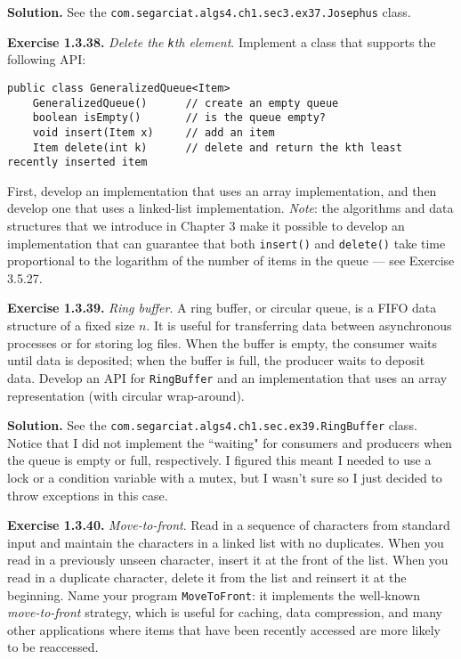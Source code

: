 \documentclass[12pt, a4paper]{article}
\newenvironment{ex}[2][Exercise]
{\par\medskip\noindent \textbf{#1 #2.}}
{\medskip}
\newenvironment{sol}[1][Solution]
{\par\medskip\noindent \textbf{#1.} }
{\medskip}
\begin{document}
	\begin{sol}
		See the \texttt{com.segarciat.algs4.ch1.sec3.ex37.Josephus} class.
	\end{sol}
	\begin{ex}{1.3.38}
		\emph{Delete the  \texttt{k}th element}. Implement a class that supports the following API:
		\begin{lstlisting}[language={}]
public class GeneralizedQueue<Item>
	GeneralizedQueue()		// create an empty queue
	boolean isEmpty()		// is the queue empty?
	void insert(Item x)		// add an item
	Item delete(int k)		// delete and return the kth least recently inserted item
		\end{lstlisting}
		First, develop an implementation that uses an array implementation, and then develop
		one that uses a linked-list implementation. \emph{Note}: the algorithms and data
		structures that we introduce in Chapter 3 make it possible to develop an implementation
		that can guarantee that both \texttt{insert()} and \texttt{delete()} take time proportional
		to the logarithm of the number of items in the queue --- see Exercise 3.5.27.
	\end{ex}
	\begin{ex}{1.3.39}
		\emph{Ring buffer}. A ring buffer, or circular queue, is a FIFO data structure of a fixed
		size $n$. It is useful for transferring data between asynchronous processes or for storing
		log files. When the buffer is empty, the consumer  waits until data is deposited;
		when the buffer is full, the producer waits to deposit data. Develop an API for
		\texttt{RingBuffer} and an implementation that uses an array representation
		(with circular wrap-around).
	\end{ex}
	\begin{sol}
		See the \texttt{com.segarciat.algs4.ch1.sec.ex39.RingBuffer} class. Notice that
		I did not implement the ``waiting" for consumers and producers when the queue
		is empty or full, respectively. I figured this meant I needed to use a lock or
		a condition variable with a mutex, but I wasn't sure so I just decided to throw
		exceptions in this case.
	\end{sol}
	\begin{ex}{1.3.40}
		\emph{Move-to-front}. Read in a sequence of characters from standard input and
		maintain the characters in a linked list with no duplicates. When you read in
		a previously unseen character, insert it at the front of the list. When you
		read in a duplicate character, delete it from the list and reinsert it at
		the beginning. Name your program \texttt{MoveToFront}: it implements the well-known
		\emph{move-to-front} strategy, which is useful for caching, data compression,
		and many other applications where items that have been recently accessed are more
		likely to be reaccessed.
	\end{ex}
\end{document}
